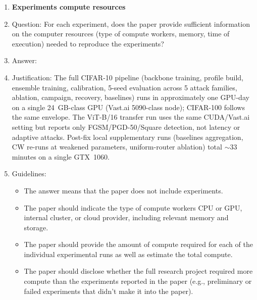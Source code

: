 \begin{enumerate}
\item {\bf Experiments compute resources}
    \item[] Question: For each experiment, does the paper provide sufficient information on the computer resources (type of compute workers, memory, time of execution) needed to reproduce the experiments?
    \item[] Answer: \answerYes{}
    \item[] Justification: The full CIFAR-10 pipeline (backbone training, profile build, ensemble training, calibration, 5-seed evaluation across 5 attack families, ablation, campaign, recovery, baselines) runs in approximately one GPU-day on a single 24~GB-class GPU (Vast.ai 5090-class node); CIFAR-100 follows the same envelope. The ViT-B/16 transfer run uses the same CUDA/Vast.ai setting but reports only FGSM/PGD-50/Square detection, not latency or adaptive attacks. Post-fix local supplementary runs (baselines aggregation, CW re-runs at weakened parameters, uniform-router ablation) total $\sim$33 minutes on a single GTX~1060.
    \item[] Guidelines:
    \begin{itemize}
        \item The answer \answerNA{} means that the paper does not include experiments.
        \item The paper should indicate the type of compute workers CPU or GPU, internal cluster, or cloud provider, including relevant memory and storage.
        \item The paper should provide the amount of compute required for each of the individual experimental runs as well as estimate the total compute. 
        \item The paper should disclose whether the full research project required more compute than the experiments reported in the paper (e.g., preliminary or failed experiments that didn't make it into the paper). 
    \end{itemize}
    

\end{enumerate}
